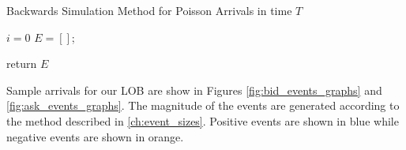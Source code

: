 \begin{algorithm}[H]
\label{alg:backwards_simulation}
\SetAlgoLined
\caption{Backwards Simulation Method for Poisson Arrivals in time $T$}
 $i = 0$\;
 $E = []$;
 
 \While{$it < T$}{
  Generate $(n_1, n_2, \ldots, n_d)$ using procedure described in section \ref{ch:generate_correlated_poisson};
  
  \For{$j = 1, \ldots, d$} {
  
    \For{$n = 1, \ldots, n_j$} {
        Generate a uniform random variable $u \in [it, (i+1)t)$;
        Generate a variable $y$ that is distributed exponentially with mean $\mu_j$
        Append $(j,y,u)$ to $E$;
    }
  
  }
 }
 return $E$ \;
\end{algorithm}

Sample arrivals for our LOB are show in Figures \ref{fig:bid_events_graphs} and \ref{fig:ask_events_graphs}. The magnitude of the events are generated according to the method described in \ref{ch:event_sizes}. Positive events are shown in blue while negative events are shown in orange.

